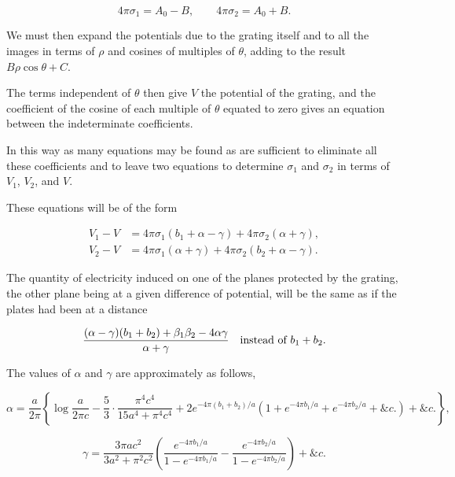 \documentclass[11pt,a4paper]{article}
\begin{document}
\begin{equation}\tag{22}
4\pi\sigma_1=A_0-B,\qquad 4\pi\sigma_2=A_0+B.
\end{equation}

We must then expand the potentials due to the grating itself and to all
the images in terms of $\rho$ and cosines of multiples of $\theta$,
adding to the result $B\rho\cos\theta+C$.

The terms independent of $\theta$ then give $V$ the potential of the
grating, and the coefficient of the cosine of each multiple of $\theta$
equated to zero gives an equation between the indeterminate
coefficients.

In this way as many equations may be found as are sufficient to eliminate
all these coefficients and to leave two equations to determine
$\sigma_1$ and $\sigma_2$ in terms of $V_1$, $V_2$, and $V$.

These equations will be of the form

\begin{equation}\tag{23}
\begin{aligned}
V_1-V&=4\pi\sigma_1(b_1+\alpha-\gamma)+4\pi\sigma_2(\alpha+\gamma),\\
V_2-V&=4\pi\sigma_1(\alpha+\gamma)+4\pi\sigma_2(b_2+\alpha-\gamma).
\end{aligned}
\end{equation}

The quantity of electricity induced on one of the planes protected by the
grating, the other plane being at a given difference of potential, will
be the same as if the plates had been at a distance

\[
\frac{(\alpha-\gamma)(b_1+b_2)+\beta_1\beta_2-4\alpha\gamma}
{\alpha+\gamma}
\quad\hbox{instead of } b_1+b_2.
\]

The values of $\alpha$ and $\gamma$ are approximately as follows,

\begin{equation}\tag{24}
\alpha=\frac{a}{2\pi}\left\{
\log\frac{a}{2\pi c}
-\frac{5}{3}\cdot\frac{\pi^4c^4}{15a^4+\pi^4c^4}
+2e^{-4\pi(b_1+b_2)/a}
\left(1+e^{-4\pi b_1/a}+e^{-4\pi b_2/a}+\&c.\right)
+\&c.\right\},
\end{equation}

\begin{equation}\tag{25}
\gamma=\frac{3\pi ac^2}{3a^2+\pi^2c^2}
\left(
\frac{e^{-4\pi b_1/a}}{1-e^{-4\pi b_1/a}}
-\frac{e^{-4\pi b_2/a}}{1-e^{-4\pi b_2/a}}
\right)+\&c.
\end{equation}
\end{document}
